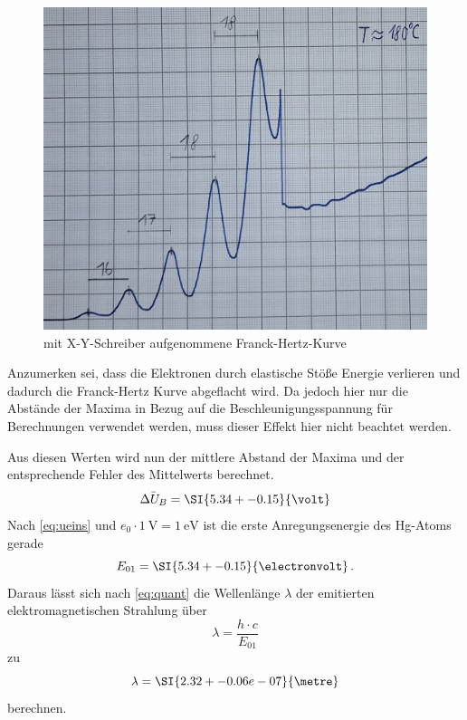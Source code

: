 \begin{figure}
    \centering
    \includegraphics[width=\textwidth]{images/franck-hertz.jpg}
    \caption{mit X-Y-Schreiber aufgenommene Franck-Hertz-Kurve}
    \label{fig:franck-hertz}
\end{figure}

Anzumerken sei, dass die Elektronen durch elastische Stöße Energie verlieren und dadurch die Franck-Hertz Kurve abgeflacht wird.
Da jedoch hier nur die Abstände der Maxima in Bezug auf die Beschleunigungsspannung für Berechnungen verwendet werden, muss dieser Effekt hier nicht beachtet werden.

Aus diesen Werten wird nun der mittlere Abstand der Maxima und der entsprechende Fehler des Mittelwerts berechnet.
\begin{equation*}
    \bar{\Delta U_B} = \SI{5.34+-0.15}{\volt}
\end{equation*}
Nach \autoref{eq:ueins} und $e_0 \cdot \SI{1}{\volt}=\SI{1}{\electronvolt}$ ist die erste Anregungsenergie des Hg-Atoms gerade
\begin{equation*}
    E_{01} = \SI{5.34+-0.15}{\electronvolt} \, .
\end{equation*}
Daraus lässt sich nach \autoref{eq:quant} die Wellenlänge $\lambda$ der emitierten elektromagnetischen Strahlung über
\begin{equation}
    \lambda = \frac{h \cdot c}{E_{01}}
\end{equation}
zu
\begin{equation*}
    \lambda = \SI{2.32+-0.06e-07}{\metre}
\end{equation*}
berechnen. 